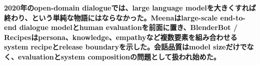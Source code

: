 \noindent\textbf{2020年のopen-domain dialogueでは、large language modelを大きくすれば終わり、という単純な物語にはならなかった。Meenaはlarge-scale end-to-end dialogue modelとhuman evaluationを前面に置き、BlenderBot / Recipesはpersona、knowledge、empathyなど複数要素を組み合わせるsystem recipeとrelease boundaryを示した。会話品質はmodel sizeだけでなく、evaluationとsystem compositionの問題として扱われ始めた。}\autocite{src-66cb10bf43ff,src-8260c320e205,src-8930f1933983}
